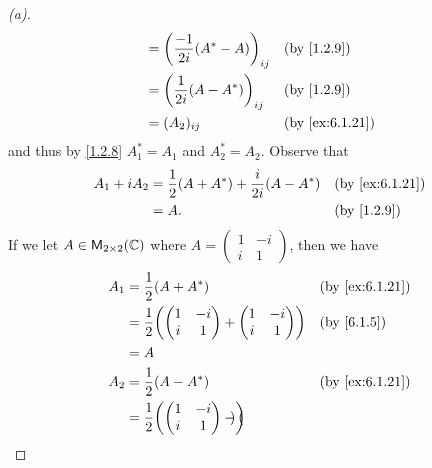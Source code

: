 \begin{proof}[(a)]
\begin{align*}
		                                                  & = \pa{\frac{-1}{2i} (A^* - A)}_{i j}                  &  & \by{1.2.9}     \\
		                                                  & = \pa{\frac{1}{2i} (A - A^*)}_{i j}                   &  & \by{1.2.9}     \\
		                                                  & = (A_2)_{i j}                                         &  & \by{ex:6.1.21}
	\end{align*}
	and thus by \cref{1.2.8} \(A_1^* = A_1\) and \(A_2^* = A_2\).
	Observe that
	\begin{align*}
		A_1 + i A_2 & = \frac{1}{2} (A + A^*) + \frac{i}{2i} (A - A^*) &  & \by{ex:6.1.21} \\
		            & = A.                                             &  & \by{1.2.9}
	\end{align*}
	If we let \(A \in \ms[2][2][\C]\) where \(A = \begin{pmatrix}
		1 & -i \\
		i & 1
	\end{pmatrix}\), then we have
	\begin{align*}
		A_1          & = \frac{1}{2} (A + A^*)           &  & \by{ex:6.1.21}            \\
		             & = \frac{1}{2} \pa{\begin{pmatrix}
				                                 1 & -i \\
				                                 i & 1
			                                 \end{pmatrix} + \begin{pmatrix}
				                                                 1 & -i \\
				                                                 i & 1
			                                                 \end{pmatrix}} &  & \by{6.1.5} \\
		             & = A                                                              \\
		A_2          & = \frac{1}{2} (A - A^*)           &  & \by{ex:6.1.21}            \\
		             & = \frac{1}{2} \pa{\begin{pmatrix}
				                                 1 & -i \\
				                                 i & 1
			                                 \end{pmatrix} - \begin{pmatrix}

\end{pmatrix}}
\end{align*}
\end{proof}
